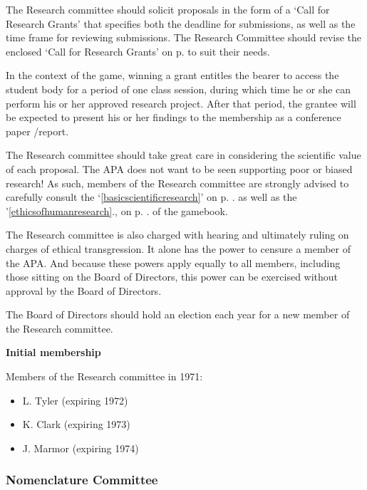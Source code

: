 \begin{refsection}
\begin{itemize}
\end{itemize}

The Research committee should solicit proposals in the form of a `Call for Research Grants' that specifies both the deadline for submissions, as well as the time frame for reviewing submissions. The Research Committee should revise the enclosed `Call for Research Grants' on p. \pageref{callforresearchgrants} to suit their needs.

In the context of the game, winning a grant entitles the bearer to access the student body for a period of one class session, during which time he or she can perform his or her approved research project. After that period, the grantee will be expected to present his or her findings to the membership as a conference paper \slash  report.

The Research committee should take great care in considering the scientific value of each proposal. The APA does not want to be seen supporting poor or biased research! As such, members of the Research committee are strongly advised to carefully consult the `\ref{basicscientificresearch}' on p. \pageref{basicscientificresearch}. as well as the '\ref{ethicsofhumanresearch}., on p. \pageref{ethicsofhumanresearch}. of the gamebook.

The Research committee is also charged with hearing and ultimately ruling on charges of ethical transgression. It alone has the power to censure a member of the APA. And because these powers apply equally to all members, including those sitting on the Board of Directors, this power can be exercised without approval by the Board of Directors.

The Board of Directors should hold an election each year for a new member of the Research committee. 

\textbf{Initial membership}

Members of the Research committee in 1971:

\begin{itemize}
\item L. Tyler (expiring 1972)

\item K. Clark (expiring 1973)

\item J. Marmor (expiring 1974)

\end{itemize}

\newpage

\subsubsection{Nomenclature Committee}
\label{nomenclaturecommittee}


\end{refsection}
